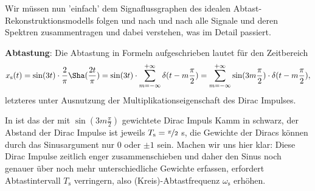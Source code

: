 \begin{ExCalc}
Wir müssen nun 'einfach' dem Signaflussgraphen des idealen Abtast-Rekonstruktionsmodells
folgen und nach und nach alle Signale und deren Spektren zusammentragen und dabei
verstehen, was im Detail passiert.

\textbf{Abtastung}:
Die Abtastung in Formeln aufgeschrieben lautet für den Zeitbereich
\begin{equation}
x_\mathrm{s}(t) = \sin(3 t) \cdot \frac{2}{\pi} {\Sha}(\frac{2 t}{\pi}) =
\sin(3 t) \cdot \sum_{m=-\infty}^{+\infty} \delta(t-m \frac{\pi}{2})=
\sum_{m=-\infty}^{+\infty} \sin(3 m \frac{\pi}{2}) \cdot \delta(t-m \frac{\pi}{2}),
\end{equation}
letzteres unter Ausnutzung der Multiplikationseigenschaft des Dirac Impulses.

In  ist das der mit $\sin(3 m \frac{\pi}{2})$
gewichtete  Dirac Impuls Kamm in schwarz, der Abstand der Dirac Impulse ist jeweils
$T_\mathrm{s}=\nicefrac{\pi}{2}$ s,
die Gewichte der Diracs können durch das Sinusargument nur $0$ oder $\pm 1$ sein.
Machen wir uns hier klar: Diese Dirac Impulse zeitlich enger zusammenschieben und daher
den Sinus noch genauer über noch mehr unterschiedliche Gewichte erfassen, erfordert
Abtastintervall $T_\mathrm{s}$ verringern, also (Kreis)-Abtastfrequenz $\omega_\mathrm{s}$
erhöhen.


\end{ExCalc}
